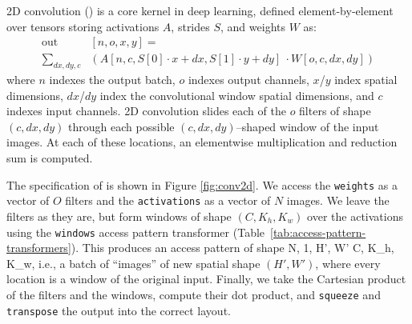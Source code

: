 2D convolution (\ctd{})
  is a core kernel
  in deep learning,
  defined element-by-element %
  over tensors storing
  activations $A$,
  strides $S$, and
  weights $W$ as: 
\begin{equation*}%
\begin{split}
\mbox{out}&[n, o, x, y] =\\
\sum_{dx, dy, c}&
    (A[n, c, S[0] \cdot x  + dx, S[1] \cdot y + dy] \
    \cdot W[o, c, dx, dy])
\end{split}
\end{equation*}
where
  $n$ indexes the output batch,
  $o$ indexes output channels,
  $x$/$y$ index spatial dimensions,
  $dx$/$dy$ index
    the convolutional window spatial dimensions,
  and $c$ indexes input channels.
2D convolution
  slides each of the $o$
  filters
  of shape $(c, dx, dy)$
  through each possible
  $(c, dx, dy)$--shaped window
  of the input images.
At each of these locations,
  an elementwise multiplication
  and reduction sum
  is computed.

The \g specification
  of \ctd{}
  is shown in 
  Figure \ref{fig:conv2d}.
We access
  the \texttt{weights}
  as a vector of $O$ filters
  and the \texttt{activations}
  as a vector of $N$ images.
We leave the filters as they are,
  but form windows
  of shape
  $(C, K_h, K_w)$
  over the activations
  using the \texttt{windows}
  access pattern transformer
  (Table~\ref{tab:access-pattern-transformers}).
This produces an access pattern
  of shape
  \accesspatternshape
  {N, 1, H', W'}
  {C, K_h, K_w},
  i.e.,
  a batch of ``images''
  of new spatial shape
  $(H', W')$,
  where every location
  is a window of
  the original input.
Finally,
  we take the Cartesian product
  of the filters
  and the windows,
  compute their dot product,
  and \texttt{squeeze} and \texttt{transpose}
  the output
  into the correct layout.
  
